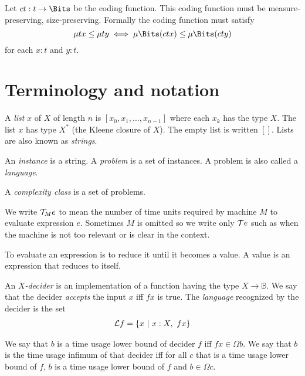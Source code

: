 Let $c t : t \to \Bits$ be the coding function.
This coding function must be measure-preserving, size-preserving.
Formally the coding function must satisfy
\[
    \mu t x \le \mu t y \iff \mu \Bits (c t x) \le \mu \Bits (c t y)
\]
for each $x : t$ and $y : t$.

\section{Terminology and notation}

\begin{mdef}
    A \emph{list} $x$ of $X$ of length $n$ is $[x_0,x_1,\ldots,x_{n-1}]$
    where each $x_k$ has the type $X$.
    The list $x$ has type $X^*$ (the Kleene closure of $X$).
    The empty list is written $[]$.
    Lists are also known as \emph{strings}.
\end{mdef}

\begin{mdef}
    An \emph{instance} is a string.
    A \emph{problem} is a set of instances.
    A problem is also called a \emph{language}.
\end{mdef}

\begin{mdef}
    A \emph{complexity class} is a set of problems.
\end{mdef}

\begin{mdef}
    We write $\mathcal{T}_M e$ to mean the number of time units required by machine $M$
    to evaluate expression $e$.
    Sometimes $M$ is omitted so we write only $\mathcal{T} e$
    such as when the machine is not too relevant
    or is clear in the context.

    To evaluate an expression is to reduce it until it becomes a value.
    A value is an expression that reduces to itself.
\end{mdef}

\begin{mdef}[decider]
An \emph{$X$-decider} is an implementation of a function having the type $X \to \mathbb B$.
We say that the decider \emph{accepts} the input $x$ iff $fx$ is true.
The \emph{language} recognized by the decider is the set
\begin{align*}
    \mathcal L f = \{ x ~|~ x : X, ~ fx \}
\end{align*}
\end{mdef}

\begin{mdef}
    We say that $b$ is a time usage lower bound of decider $f$ iff $fx \in \Omega b$.
    We say that $b$ is the time usage infimum of that decider iff
    for all $c$ that is a time usage lower bound of $f$,
    $b$ is a time usage lower bound of $f$ and $b \in \Omega c$.
\end{mdef}

